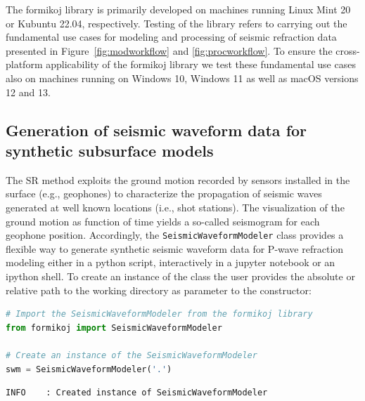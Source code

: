 \documentclass[a4paper,fleqn]{cas-sc}
\begin{document}
The formikoj library is primarily developed on machines running Linux Mint \num{20} or Kubuntu \num{22}.\num{04}, respectively. Testing of the library refers to carrying out the fundamental use cases for modeling and processing of seismic refraction data presented in Figure~\ref{fig:modworkflow} and \ref{fig:procworkflow}. To ensure the cross-platform applicability of the formikoj library we test these fundamental use cases also on machines running on Windows \num{10}, Windows \num{11} as well as macOS versions \num{12} and \num{13}.

\subsection{Generation of seismic waveform data for synthetic subsurface models}

The SR method exploits the ground motion recorded by sensors installed in the surface (e.g., geophones) to characterize the propagation of seismic waves generated at well known locations (i.e., shot stations). 
The visualization of the ground motion as function of time yields a so-called seismogram for each geophone position.
Accordingly, the \texttt{SeismicWaveformModeler} class provides a flexible way to generate synthetic seismic waveform data for P-wave refraction modeling either in a python script, interactively in a jupyter notebook or an ipython shell.
To create an instance of the class the user provides the absolute or relative path to the working directory as parameter to the constructor:
\begin{lstlisting}[language=Python]
# Import the SeismicWaveformModeler from the formikoj library
from formikoj import SeismicWaveformModeler

# Create an instance of the SeismicWaveformModeler
swm = SeismicWaveformModeler('.')

\end{lstlisting}

\begin{footnotesize}
\begin{verbatim}
INFO    : Created instance of SeismicWaveformModeler
\end{verbatim}
\end{footnotesize}
\end{document}
